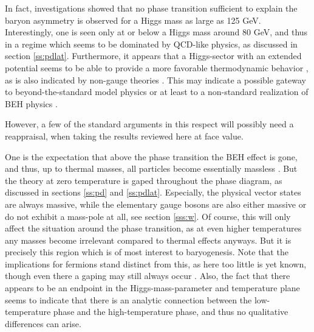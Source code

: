 \documentclass[final,twoside,12pt]{article}
\newcommand*{\1}{1\!\!\!\bot}
\begin{document}
In fact, investigations \cite{Kajantie:1996mn,Csikor:1998ge} showed that no phase transition sufficient to explain the baryon asymmetry is observed for a Higgs mass as large as 125 GeV. Interestingly, one is seen only at or below a Higgs mass around 80 GeV, and thus in a regime which seems to be dominated by QCD-like physics, as discussed in section \ref{ss:pdlat}. Furthermore, it appears that a Higgs-sector with an extended potential seems to be able to provide a more favorable thermodynamic behavior \cite{Grojean:2004xa,Reichert:2017puo}, as is also indicated by non-gauge theories \cite{Chu:2017vmc,Hegde:2013mks,Akerlund:2015fya}. This may indicate a possible gateway to beyond-the-standard model physics or at least to a non-standard realization of BEH physics \cite{Reichert:2017puo}.

However, a few of the standard arguments in this respect will possibly need a reappraisal, when taking the results reviewed here at face value.

One is the expectation that above the phase transition the BEH effect is gone, and thus, up to thermal masses, all particles become essentially massless \cite{Kapusta:2006pm}. But the theory at zero temperature is gaped throughout the phase diagram, as discussed in sections \ref{ss:pd} and \ref{ss:pdlat}. Especially, the physical vector states are always massive, while the elementary gauge bosons are also either massive or do not exhibit a mass-pole at all, see section \ref{sss:w}. Of course, this will only affect the situation around the phase transition, as at even higher temperatures any masses become irrelevant compared to thermal effects anyways. But it is precisely this region which is of most interest to baryogenesis. Note that the implications for fermions stand distinct from this, as here too little is yet known, though even there a gaping may still always occur \cite{Iida:2007qp}. Also, the fact that there appears to be an endpoint in the Higgs-mass-parameter and temperature plane \cite{Kapusta:2006pm,Kajantie:1996mn,Csikor:1998ge} seems to indicate that there is an analytic connection between the low-temperature phase and the high-temperature phase, and thus no qualitative differences can arise.
\end{document}
